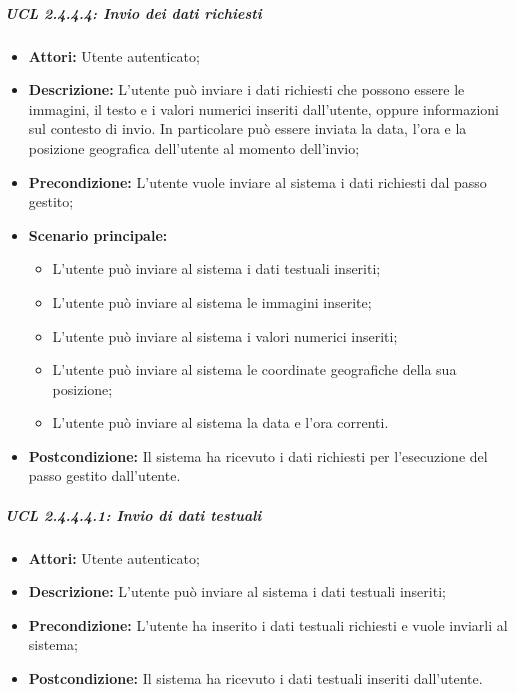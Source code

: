 \subparagraph{UCL 2.4.4.4: Invio dei dati richiesti}
\begin{itemize}
\item \textbf{Attori:} Utente autenticato;
\item \textbf{Descrizione:} L'utente può inviare i dati richiesti che possono essere le immagini, il testo e i valori numerici inseriti dall'utente, oppure informazioni sul contesto di invio. In particolare può essere inviata la data, l'ora e la posizione geografica dell'utente al momento dell'invio;
\item \textbf{Precondizione:} L'utente vuole inviare al sistema i dati richiesti dal passo gestito;
\item \textbf{Scenario principale:}
\begin{itemize}
\item L'utente può inviare al sistema i dati testuali inseriti;
\item L'utente può inviare al sistema le immagini inserite;
\item L'utente può inviare al sistema i valori numerici inseriti;
\item L'utente può inviare al sistema le coordinate geografiche della sua posizione;
\item L'utente può inviare al sistema la data e l'ora correnti.
\end{itemize}
\item \textbf{Postcondizione:} Il sistema ha ricevuto i dati richiesti per l'esecuzione del passo gestito dall'utente.
\end{itemize}

\subparagraph{UCL 2.4.4.4.1: Invio di dati testuali}
\begin{itemize}
\item \textbf{Attori:} Utente autenticato;
\item \textbf{Descrizione:} L'utente può inviare al sistema i dati testuali inseriti;
\item \textbf{Precondizione:} L'utente ha inserito i dati testuali richiesti e vuole inviarli al sistema;
\item \textbf{Postcondizione:} Il sistema ha ricevuto i dati testuali inseriti dall'utente.
\end{itemize}

